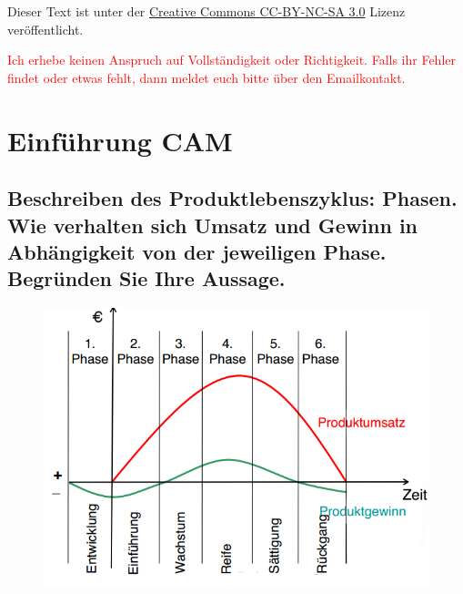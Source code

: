 

\usepackage{paralist}



\maketitle

Dieser Text ist unter der
\href{http://creativecommons.org/licenses/by-nc-sa/3.0/}{Creative Commons CC-BY-NC-SA 3.0}
Lizenz veröffentlicht.

\textcolor{red}{%
    Ich erhebe keinen Anspruch auf Vollständigkeit oder Richtigkeit. Falls ihr
    Fehler findet oder etwas fehlt, dann meldet euch bitte über den
    Emailkontakt.
}

\tableofcontents

\newpage

\section{Einführung CAM}

\subsection*{%
    Beschreiben des Produktlebenszyklus: Phasen. Wie verhalten sich Umsatz und
    Gewinn in Abhängigkeit von der jeweiligen Phase. Begründen Sie Ihre
    Aussage.
}


\begin{figure}[h]
    \centering
    \includegraphics[scale=0.7]{Bild1_1.png}
\end{figure}

